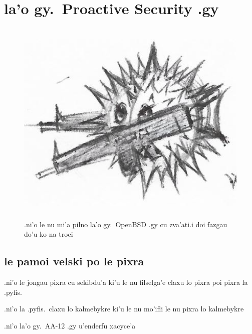 \documentclass{report}
\begin{document}
\chapter{la'o gy.\ Proactive Security .gy}
\begin{figure}[ht]
	\centering
	\includegraphics[height=10cm]{proactivesecurity/proactivesecurity.png}
	\caption[center]{.ni'o le nu mi'a pilno la'o gy.\ OpenBSD .gy cu zva'ati\@  .i doi fazgau do'u ko na troci}
\end{figure}
\section{le pamoi velski po le pixra}
.ni'o le jongau pixra cu sekibdu'a ki'u le nu filselga'e claxu lo pixra poi pixra la .pyfis.

.ni'o la .pyfis.\ claxu lo kalmebykre ki'u le nu mo'ifli le nu pixra lo kalmebykre

.ni'o la'o gy.\ AA-12 .gy u'enderfu xacyce'a
\end{document}

